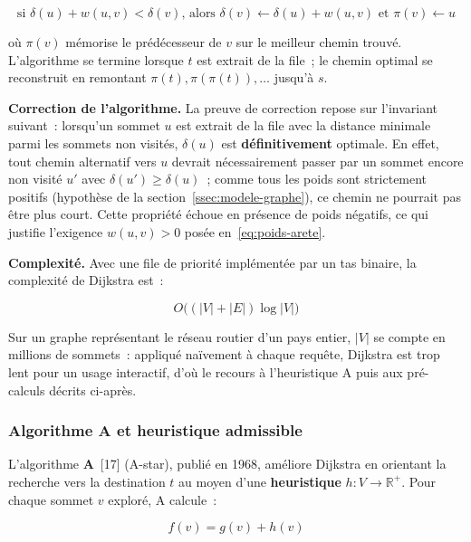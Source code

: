 \documentclass[12pt, a4paper]{report}
\begin{document}
\begin{equation}
  \text{si } \delta(u) + w(u, v) < \delta(v) \text{, alors }
  \delta(v) \leftarrow \delta(u) + w(u, v) \text{ et } \pi(v) \leftarrow u
  \label{eq:relaxation}
\end{equation}

où $\pi(v)$ mémorise le prédécesseur de $v$ sur le meilleur chemin trouvé.
L'algorithme se termine lorsque $t$ est extrait de la file~; le chemin optimal
se reconstruit en remontant $\pi(t), \pi(\pi(t)), \dots$ jusqu'à $s$.

\textbf{Correction de l'algorithme.} La preuve de correction repose sur
l'invariant suivant~: lorsqu'un sommet $u$ est extrait de la file avec la
distance minimale parmi les sommets non visités, $\delta(u)$ est
\textbf{définitivement} optimale. En effet, tout chemin alternatif vers $u$
devrait nécessairement passer par un sommet encore non visité $u'$ avec
$\delta(u') \geq \delta(u)$~; comme tous les poids sont strictement positifs
(hypothèse de la section~\ref{ssec:modele-graphe}), ce chemin ne pourrait pas
être plus court. Cette propriété échoue en présence de poids négatifs, ce qui
justifie l'exigence $w(u,v) > 0$ posée en~\eqref{eq:poids-arete}.

\textbf{Complexité.} Avec une file de priorité implémentée par un tas
binaire, la complexité de Dijkstra est~:

\begin{equation}
  O\big((|V| + |E|) \log |V|\big)
  \label{eq:complexite-dijkstra}
\end{equation}

Sur un graphe représentant le réseau routier d'un pays entier, $|V|$ se
compte en millions de sommets~: appliqué naïvement à chaque requête,
Dijkstra est trop lent pour un usage interactif, d'où le recours à
l'heuristique A\* puis aux pré-calculs décrits ci-après.

\subsubsection{Algorithme A\* et heuristique admissible}
\label{ssec:astar-heuristique}

L'algorithme \textbf{A\*}~[17] (A-star), publié en 1968, améliore Dijkstra en orientant la
recherche vers la destination $t$ au moyen d'une \textbf{heuristique}
$h : V \rightarrow \mathbb{R}^{+}$. Pour chaque sommet $v$ exploré, A\*
calcule~:

\begin{equation}
  f(v) = g(v) + h(v)
  \label{eq:astar-f}
\end{equation}
\end{document}
